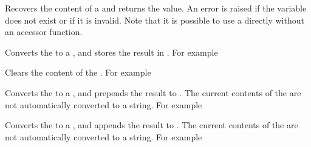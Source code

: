 \documentclass[oneside]{book}
\begin{document}
\begin{function}{\StrUse}
\begin{syntax}
 
\end{syntax}
Recovers the content of a  and returns the value.
An error is raised if the variable
does not exist or if it is invalid. Note that it is possible to use
a  directly without an accessor function.
\end{function}

\begin{function}{\StrSet}
\begin{syntax}
  
\end{syntax}
Converts the  to a , and stores the
result in . For example
\begin{demohigh}
\StrSet{}
\StrUse\lTmpiStr
\end{demohigh}
\end{function}

\begin{function}{\StrClear}
\begin{syntax}
 
\end{syntax}
Clears the content of the . For example
\begin{demohigh}
\StrSet{}
\StrClear\lTmpjStr
\StrSet{}
\StrUse\lTmpjStr
\end{demohigh}
\end{function}

\begin{function}{\StrPutLeft}
\begin{syntax}
  
\end{syntax}
Converts the  to a , and prepends the
result to .  The current contents of the  are not automatically converted to a string. For example
\begin{demohigh}
\StrSet{}
\StrPutLeft{}
\StrUse\lTmpkStr
\end{demohigh}
\end{function}

\begin{function}{\StrPutRight}
\begin{syntax}
  
\end{syntax}
Converts the  to a , and appends the
result to .  The current contents of the  are not automatically converted to a string. For example
\begin{demohigh}
\StrSet{}
\StrPutRight{}
\StrUse\lTmpkStr
\end{demohigh}
\end{function}
\end{document}
